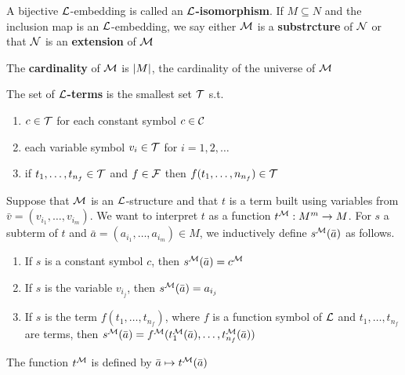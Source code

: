\documentclass[11pt]{article}
\begin{document}
A bijective \(\mathcal{L}\)-embedding is called an \textbf{\(\mathcal{L}\)-isomorphism}. If
\(M\subseteq N\) and the inclusion map is an \(\mathcal{L}\)-embedding, we say either
\(\mathcal{M}\) is a \textbf{substrcture} of \(\mathcal{N}\) or that \(\mathcal{N}\) is an \textbf{extension}
of \(\mathcal{M}\)

The \textbf{cardinality} of \(\mathcal{M}\) is \(\abs{M}\), the cardinality of the universe of \(\mathcal{M}\)

\begin{definition}[]
The set of \textbf{\(\mathcal{L}\)-terms} is the smallest set \(\mathcal{T}\) s.t.
\begin{enumerate}
\item \(c\in\mathcal{T}\) for each constant symbol \(c\in\mathcal{C}\)
\item each variable symbol \(v_i\in\mathcal{T}\) for \(i=1,2,\dots\)
\item if \(t_1,\dots,t_{n_f}\in\mathcal{T}\) and \(f\in\mathcal{F}\) then
\(f(t_1,\dots,n_{n_f})\in\mathcal{T}\)
\end{enumerate}
\end{definition}


Suppose that \(\mathcal{M}\) is an \(\mathcal{L}\)-structure and that \(t\) is a term built
using variables from \(\bar{v}=(v_{i_1},\dots,v_{i_m})\). We want to interpret
\(t\) as a function \(t^{\mathcal{M}}:M^m\to M\). For \(s\) a subterm of \(t\) and
\(\bar{a}=(a_{i_1},\dots,a_{i_m})\in M\), we inductively define
\(s^{\mathcal{M}}(\bar{a})\) as follows.
\begin{enumerate}
\item If \(s\) is a constant symbol \(c\), then \(s^{\mathcal{M}}(\bar{a})=c^{\mathcal{M}}\)
\item If \(s\) is the variable \(v_{i_j}\), then \(s^{\mathcal{M}}(\bar{a})=a_{i_j}\)
\item If \(s\) is the term \(f(t_1,\dots,t_{n_f})\), where \(f\) is a function symbol
of \(\mathcal{L}\) and \(t_1,\dots,t_{n_f}\) are terms, then 
\(s^{\mathcal{M}}(\bar{a})=f^{\mathcal{M}}(t^{\mathcal{M}}_1(\bar{a}),\dots,t_{n_f}^{\mathcal{M}}(\bar{a}))\)
\end{enumerate}


The function \(t^{\mathcal{M}}\) is defined by \(\bar{a}\mapsto t^{\mathcal{M}}(\bar{a})\)
\end{document}
